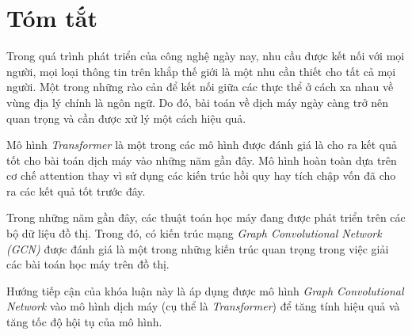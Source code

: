 \chapter*{Tóm tắt}
\label{abstract}

Trong quá trình phát triển của công nghệ ngày nay, nhu cầu được kết nối với mọi người, mọi loại thông tin trên khắp thế giới là một nhu cần thiết cho tất cả mọi người. Một trong những rào cản để kết nối giữa các thực thể ở cách xa nhau về vùng địa lý chính là ngôn ngữ. Do đó, bài toán về dịch máy ngày càng trở nên quan trọng và cần được xử lý một cách hiệu quả.

Mô hình \textit{Transformer} là một trong các mô hình được đánh giá là cho ra kết quả tốt cho bài toán dịch máy vào những năm gần đây. Mô hình hoàn toàn dựa trên cơ chế attention thay vì sử dụng các kiến trúc hồi quy hay tích chập vốn đã cho ra các kết quả tốt trước đây.

Trong những năm gần đây, các thuật toán học máy đang được phát triển trên các bộ dữ liệu đồ thị. Trong đó, có kiến trúc mạng \textit{Graph Convolutional Network (GCN)} được đánh giá là một trong những kiến trúc quan trọng trong việc giải các bài toán học máy trên đồ thị. 

Hướng tiếp cận của khóa luận này là áp dụng được mô hình \textit{Graph Convolutional Network} vào mô hình dịch máy (cụ thể là \textit{Transformer}) để tăng tính hiệu quả và tăng tốc độ hội tụ của mô hình.